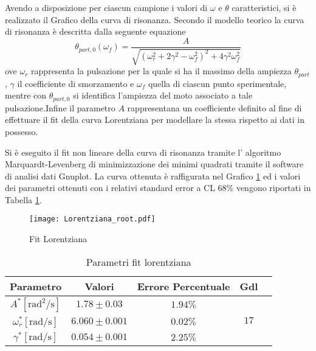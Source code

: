 \documentclass[a4paper,11pt,oneside]{article}
\begin{document}
Avendo a disposizione per ciascun campione i valori di $\omega$ e $\theta$ caratteristici, si è realizzato il Grafico della curva di risonanza. Secondo il modello teorico la curva di risonanza è descritta dalla seguente equazione
\begin{equation*}
    \theta_{part, 0}(\omega_{f}) = \frac{A}{\sqrt{(\omega_{r}^2+ 2\gamma^2-\omega_{f}^2)^2+4\gamma^2\omega_{f}^2}}
\end{equation*}
ove $\omega_{r}$ rappresenta la pulsazione per la quale si ha il massimo della ampiezza $\theta_{part}$, $\gamma$ il coefficiente di smorzamento e $\omega_{f}$ quella di ciascun punto sperimentale, mentre con $\theta_{part,0}$ si identifica l'ampiezza del moto associato a tale pulsazione.Infine il parametro $A$ rappresentana un  coefficiente definito al fine di effettuare il fit della curva Lorentziana per modellare la stessa rispetto ai dati in possesso.

Si è eseguito il fit non lineare della curva di risonanza tramite l' algoritmo Marquardt-Levenberg di minimizzazione dei minimi quadrati tramite il software di analisi dati Gnuplot.
La curva ottenuta è raffigurata nel Grafico \ref{fig:lorentziana_root} ed i valori dei parametri ottenuti con i relativi standard error a CL 68\% vengono riportati in Tabella \ref{tab:parametri_fit_lorentziana}. \newline

\begin{figure}[h!]
    \centering
    \texttt{[image: Lorentziana\_root.pdf]}
    \caption{Fit Lorentziana}
    \label{fig:lorentziana_root}
\end{figure}

\begin{table}[h!]
    \centering
    \begin{tabular}{|c|c|c|c|c|}
        \hline
        Parametro & Valori & Errore Percentuale & Gdl \\ \hline
        \cellcolor[rgb]{0.85,0.85,0.85}$A^{\ast}  [ \si{\radian\squared\per\second} ]$ & \cellcolor[rgb]{0.85,0.85,0.85}$1.78\pm0.03$ & \cellcolor[rgb]{0.85,0.85,0.85}$1.94\%$ & \multirow{3}{*}{$17$}  \\ \cline{1-3}
        $\omega_{r}^{\ast} [\si{\radian\per\second}]$ & $6.060\pm0.001$ & $0.02\%$ &  \\ \cline{1-3}
        \cellcolor[rgb]{0.85,0.85,0.85} $\gamma^{\ast} [\si{\radian\per\second}]$& \cellcolor[rgb]{0.85,0.85,0.85}$0.054\pm0.001$ & \cellcolor[rgb]{0.85,0.85,0.85}$2.25\%$ &  \\ \hline
    \end{tabular}
    \caption{Parametri fit lorentziana}
    \label{tab:parametri_fit_lorentziana}
\end{table}
\end{document}

